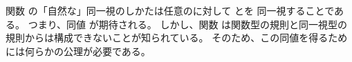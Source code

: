 \documentclass[index]{subfiles}
\begin{document}

関数
の「自然な」同一視のしかたは任意のに対して
とを
同一視することである。
つまり、同値
が期待される。
しかし、関数
は関数型の規則と同一視型の規則からは構成できないことが知られている。
そのため、この同値を得るためには何らかの公理が必要である。





\begin{myShiftSections}
  
\end{myShiftSections}
\end{document}
